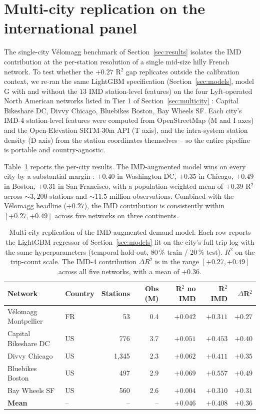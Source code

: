 \documentclass[11pt,a4paper]{article}
\begin{document}
\section{Multi-city replication on the international panel}
\label{sec:multicity-results}

The single-city V\'elomagg benchmark of Section~\ref{sec:results}
isolates the IMD contribution at the per-station resolution of a
single mid-size hilly French network.  To test whether the
$+0.27$ R$^2$ gap replicates outside the calibration context, we
re-ran the same LightGBM specification (Section~\ref{sec:models},
model G with and without the $13$ IMD station-level features) on
the four Lyft-operated North American networks listed in
Tier 1 of Section~\ref{sec:multicity} : Capital Bikeshare DC,
Divvy Chicago, Bluebikes Boston, Bay Wheels SF.  Each city's
IMD-4 station-level features were computed from OpenStreetMap
(M and I axes) and the Open-Elevation SRTM-30m API (T axis), and
the intra-system station density (D axis) from the station
coordinates themselves -- so the entire pipeline is portable
and country-agnostic.

Table~\ref{tab:multicity} reports the per-city results.  The
IMD-augmented model wins on every city by a substantial margin :
$+0.40$ in Washington DC, $+0.35$ in Chicago, $+0.49$ in Boston,
$+0.31$ in San Francisco, with a population-weighted mean of
$+0.39$ R$^2$ across $\sim 3{,}200$ stations and $\sim 11.5$
million observations.  Combined with the V\'elomagg headline
($+0.27$), the IMD contribution is consistently within
$[+0.27, +0.49]$ across five networks on three continents.

\begin{table}[H]
\centering
\caption{Multi-city replication of the IMD-augmented demand model.
Each row reports the LightGBM regressor of
Section~\ref{sec:models} fit on the city's full trip log with the
same hyperparameters (temporal hold-out, $80$\,\% train /
$20$\,\% test).  $R^2$ on the trip-count scale.  The IMD-4
contribution $\Delta R^2$ is in the range $[+0.27, +0.49]$ across
all five networks, with a mean of $+0.36$.}
\label{tab:multicity}
\small
\begin{tabular}{@{}llrrrrr@{}}
\toprule
Network              & Country & Stations & Obs (M)  & R$^2$ no IMD & R$^2$ IMD & $\Delta$R$^2$ \\
\midrule
V\'elomagg Montpellier   & FR & 53   & 0.4 & $+0.042$ & $+0.311$ & $+0.27$ \\
Capital Bikeshare DC      & US & 776  & 3.7 & $+0.051$ & $+0.453$ & $+0.40$ \\
Divvy Chicago              & US & 1{,}345 & 2.3 & $+0.062$ & $+0.411$ & $+0.35$ \\
Bluebikes Boston           & US & 497  & 2.9 & $+0.069$ & $+0.557$ & $+0.49$ \\
Bay Wheels SF             & US & 560  & 2.6 & $+0.004$ & $+0.310$ & $+0.31$ \\
\midrule
\textbf{Mean}             & --  & --   & --  & $+0.046$ & $+0.408$ & $+0.36$ \\
\bottomrule
\end{tabular}
\end{table}
\end{document}
